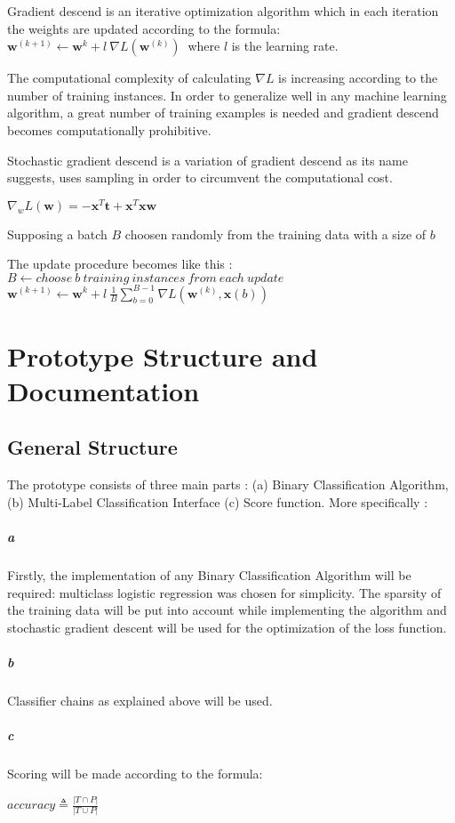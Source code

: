 \documentclass[10pt,letterpaper]{article}
\begin{document}
	 Gradient descend is an iterative optimization algorithm which in each iteration the weights are updated according to the formula:
	 $\textbf{w}^{(k+1)} \leftarrow \textbf{w}^{k} + l\ \nabla L(\textbf{w}^{(k)}) \ $ where $l$ is the learning rate. 
	 
	 The computational complexity of calculating $\nabla L$ is increasing according to the number of training instances. In order to generalize well in any machine learning algorithm, a great number of training examples is needed and gradient descend becomes computationally prohibitive.
	 
	 Stochastic gradient descend is a variation of gradient descend as its name suggests, uses sampling in order to circumvent the computational cost.
	 
	 
	 $\nabla_{w} L(\textbf{w}) = - \textbf{x}^{T}\textbf{t}+\textbf{x}^{T}\textbf{x}\textbf{w} $
	 
	 Supposing a batch $B$ choosen randomly from the training data with a size of $b$
	 
	 The update procedure becomes like this : 
	 $B \leftarrow choose\  b \ training \ instances\  from\  each \ update$
	 $\textbf{w}^{(k+1)} \leftarrow \textbf{w}^{k} + l\ \frac{1}{B} \sum_{b=0}^{B-1} \nabla L(\textbf{w}^{(k)},\textbf{x}(b)) \ $
	 
	\section*{Prototype Structure and Documentation}
	\subsection*{General Structure}
	The prototype consists of three main parts : (a) Binary Classification Algorithm, (b) Multi-Label Classification Interface (c) Score function.  More specifically :

	\subparagraph{a}Firstly, the implementation of any Binary Classification Algorithm will be required: multiclass logistic regression was chosen for simplicity. 
	The sparsity of the training data will be put into account while implementing the algorithm and stochastic gradient descent will be used for the optimization of the loss function.
	
	\subparagraph{b}Classifier chains as explained above will be used.
	
	\subparagraph{c}Scoring will be made according to the formula:
	\begin{center}
		$accuracy \triangleq \frac{|T \cap P|}{|T \cup P |}$
	\end{center}
	
\end{document}
